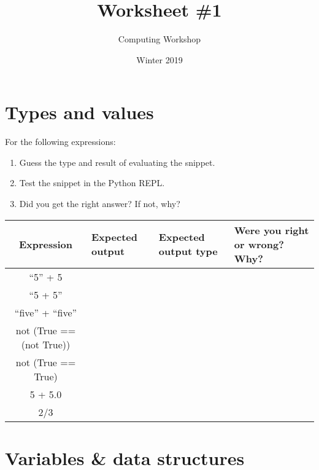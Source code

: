 \documentclass[11pt]{article}
\author{Computing Workshop}
\title{Worksheet \#1}
\date{Winter 2019}
\begin{document}
\maketitle

\section*{Types and values}

For the following expressions:
\begin{enumerate}
  \item
    Guess the type and result of evaluating the snippet.
  \item
    Test the snippet in the Python REPL.
  \item
    Did you get the right answer? If not, why?
\end{enumerate}

\begin{center}
\renewcommand{\arraystretch}{3.5}
\begin{tabular}{| c | p{5em}| p{5em} | p{21em} |}
    \hline %
    \textbf{Expression} & \textbf{Expected output}
    & \textbf{Expected output type} & \textbf{Were you right or wrong? Why?} \\ \hline
    ``5'' + 5 & ~ & ~ & ~ \\ \hline
    ``5 + 5'' & ~ & ~ & ~ \\ \hline
    ``five'' + ``five'' & ~ & ~ & ~ \\ \hline
    not (True == (not True)) & ~ & ~ & ~ \\ \hline
    not (True == True) & ~ & ~ & ~ \\ \hline
    5 + 5.0 & ~ & ~ & ~ \\ \hline
    2/3 & ~ & ~ & ~ \\ \hline
\end{tabular}
\end{center}

\newpage

\section*{Variables \& data structures}
\end{document}
